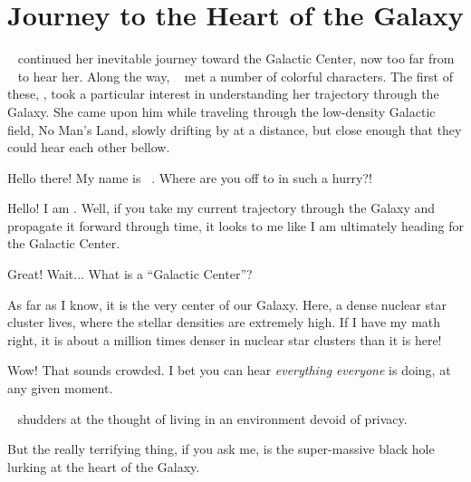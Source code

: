 \documentclass[main.tex]{subfiles}
\begin{document}
\section{Journey to the Heart of the Galaxy} \label{journey}

\newpara \nar \rmelectra~ continued her inevitable journey toward the Galactic Center, now too far from \rmaethra~ to hear her.  Along the way, \rmelectra~ met a number of colorful characters.  The first of these, \rmdardanus, took a particular interest in understanding her trajectory through the Galaxy.  She came upon him while traveling through the low-density Galactic field, No Man's Land, slowly drifting by at a distance, but close enough that they could hear each other bellow.

\newpara \Dardanus Hello there!  My name is \rmdardanus~.  Where are you off to in such a hurry?!

\newpara \Electra  Hello!  I am \rmelectra.  Well, if you take my current trajectory through the Galaxy and propagate it forward through time, it looks to me like I am ultimately heading for the Galactic Center.

\newpara \Dardanus  Great!  Wait... What is a ``Galactic Center''?

\newpara \Electra  As far as I know, it is the very center of our Galaxy.  Here, a dense nuclear star cluster lives, where the stellar densities are extremely high.  If I have my math right, it is about a million times denser in nuclear star clusters than it is here!

\newpara \Dardanus  Wow!  That sounds crowded.  I bet you can hear \textit{everything} \textit{everyone} is doing, at any given moment.  

\newpara \nar \rmdardanus~ shudders at the thought of living in an environment devoid of privacy.

\newpara \Electra But the really terrifying thing, if you ask me, is the super-massive black hole lurking at the heart of the Galaxy.
\end{document}
